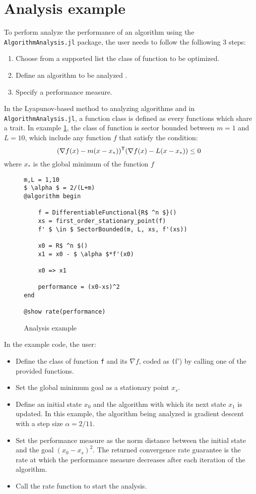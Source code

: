 \section{Analysis example}
To perform analyze the performance of an algorithm using the \texttt{AlgorithmAnalysis.jl} package, the user needs to follow the folliowing 3 steps:
\begin{enumerate}
	\item Choose from a supported list the class of function to be optimized.
	\item Define an algorithm to be analyzed .
	\item Specify a performance measure.
\end{enumerate}
In the Lyapunov-based method to analyzing algorithms and in \texttt{AlgorithmAnalysis.jl}, a function class is defined as every functions which share a trait. In example \ref{ex_analysis}, the class of function is sector bounded between $m=1$ and $L=10$, which include any function $f$ that satisfy the condition:
\begin{equation}
  (\nabla f(x) - m(x-x_*))^{\mathsf{T}} (\nabla f(x) - L(x-x_*)) \leq 0
\end{equation}
where $x_*$ is the global minimum of the function $f$
\begin{figure}[h!]
	\begin{lstlisting}[mathescape]
m,L = 1,10
$ \alpha $ = 2/(L+m)
@algorithm begin

	f = DifferentiableFunctional{R$ ^n $}()
	xs = first_order_stationary_point(f)
	f' $ \in $ SectorBounded(m, L, xs, f'(xs))

	x0 = R$ ^n $()
	x1 = x0 - $ \alpha $*f'(x0)

	x0 => x1

	performance = (x0-xs)^2
end

@show rate(performance)
\end{lstlisting}
\caption{Analysis example}
\label{ex_analysis}
\end{figure}
In the example code, the user:
\begin{itemize}
	\item Define the class of function \texttt{f} and its $\nabla f$, coded as \texttt(f') by calling one of the provided functions.
	\item Set the global minimum goal as a stationary point $ x_s $.
	\item Define an initial state $ x_0 $ and the algorithm with which its next state $ x_1$ is updated. In this example, the algorithm being analyzed is gradient descent with a step size $ \alpha = 2/11$.
	\item Set the performance measure as the norm distance between the initial state and the goal $ (x_0 - x_s)^2 $. The returned convergence rate guarantee is the rate at which the performance measure decreases after each iteration of the algorithm.
	\item Call the rate function to start the analysis.
\end{itemize}

